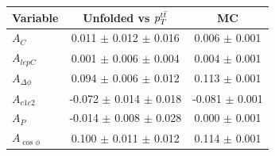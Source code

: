 \begin{table}[hbt]
\begin{center}
\begin{tabular}{l |  c  c }
\hline
Variable &  Unfolded vs $p_T^{t\bar{t}}$  &  MC \\ \hline
$A_{C}$                                 & 0.011 $\pm$ 0.012     $\pm$ 0.016      & 0.006 $\pm$  0.001 \\
$A_{lepC}$                              & 0.001 $\pm$ 0.006     $\pm$ 0.004          & 0.004 $\pm$  0.001 \\
$A_{\Delta\phi}$                & 0.094 $\pm$ 0.006     $\pm$ 0.012          & 0.113 $\pm$  0.001 \\
$A_{c1c2}$                              & -0.072 $\pm$ 0.014 $\pm$ 0.018         & -0.081 $\pm$  0.001 \\
$A_{P}$                   & -0.014 $\pm$ 0.008 $\pm$ 0.028         & 0.000 $\pm$  0.001 \\
$A_{\cos\phi}$                              & 0.100 $\pm$ 0.011     $\pm$ 0.012          & 0.114 $\pm$  0.001 \\
 \hline
\end{tabular}
\end{center}
\end{table}

